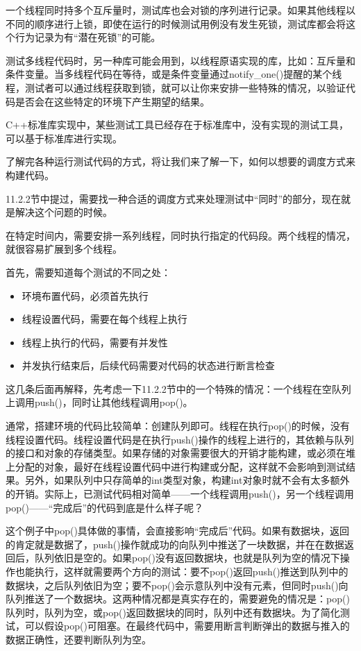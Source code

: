 一个线程同时持多个互斥量时，测试库也会对锁的序列进行记录。如果其他线程以不同的顺序进行上锁，即使在运行的时候测试用例没有发生死锁，测试库都会将这个行为记录为有“潜在死锁”的可能。

测试多线程代码时，另一种库可能会用到，以线程原语实现的库，比如：互斥量和条件变量。当多线程代码在等待，或是条件变量通过notify\_one()提醒的某个线程，测试者可以通过线程获取到锁，就可以让你来安排一些特殊的情况，以验证代码是否会在这些特定的环境下产生期望的结果。

C++标准库实现中，某些测试工具已经存在于标准库中，没有实现的测试工具，可以基于标准库进行实现。

了解完各种运行测试代码的方式，将让我们来了解一下，如何以想要的调度方式来构建代码。


11.2.2节中提过，需要找一种合适的调度方式来处理测试中“同时”的部分，现在就是解决这个问题的时候。

在特定时间内，需要安排一系列线程，同时执行指定的代码段。两个线程的情况，就很容易扩展到多个线程。

首先，需要知道每个测试的不同之处：

\begin{itemize}
    \item 环境布置代码，必须首先执行
    \item 线程设置代码，需要在每个线程上执行
    \item 线程上执行的代码，需要有并发性
    \item 并发执行结束后，后续代码需要对代码的状态进行断言检查
\end{itemize}

这几条后面再解释，先考虑一下11.2.2节中的一个特殊的情况：一个线程在空队列上调用push()，同时让其他线程调用pop()。

通常，搭建环境的代码比较简单：创建队列即可。线程在执行pop()的时候，没有线程设置代码。线程设置代码是在执行push()操作的线程上进行的，其依赖与队列的接口和对象的存储类型。如果存储的对象需要很大的开销才能构建，或必须在堆上分配的对象，最好在线程设置代码中进行构建或分配，这样就不会影响到测试结果。另外，如果队列中只存简单的int类型对象，构建int对象时就不会有太多额外的开销。实际上，已测试代码相对简单——一个线程调用push()，另一个线程调用pop()——“完成后”的代码到底是什么样子呢？

这个例子中pop()具体做的事情，会直接影响“完成后”代码。如果有数据块，返回的肯定就是数据了，push()操作就成功的向队列中推送了一块数据，并在在数据返回后，队列依旧是空的。如果pop()没有返回数据块，也就是队列为空的情况下操作也能执行，这样就需要两个方向的测试：要不pop()返回push()推送到队列中的数据块，之后队列依旧为空；要不pop()会示意队列中没有元素，但同时push()向队列推送了一个数据块。这两种情况都是真实存在的，需要避免的情况是：pop()队列时，队列为空，或pop()返回数据块的同时，队列中还有数据块。为了简化测试，可以假设pop()可阻塞。在最终代码中，需要用断言判断弹出的数据与推入的数据正确性，还要判断队列为空。

